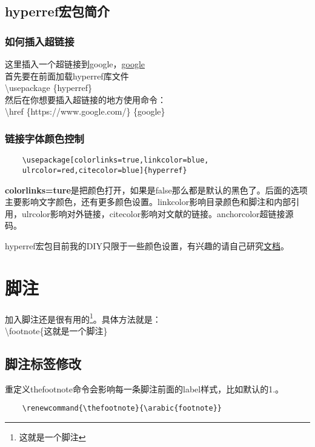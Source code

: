 \documentclass[11pt,oneside]{book}
\begin{document}
  \section{hyperref宏包简介}
  \subsection{如何插入超链接}
  这里插入一个超链接到google，\href{https://www.google.com/}{google}\\
  首先要在前面加载hyperref库文件\\
  \textbackslash usepackage \{hyperref\}\\
  然后在你想要插入超链接的地方使用命令：\\
  \textbackslash href \{https://www.google.com/\} \{google\}

  \subsection{链接字体颜色控制}
  \begin{Verbatim}
    \usepackage[colorlinks=true,linkcolor=blue,
    ulrcolor=red,citecolor=blue]{hyperref}
  \end{Verbatim}

  \textbf{colorlinks=ture}是把颜色打开，如果是false那么都是默认的黑色了。后面的选项主要影响文字颜色，还有更多颜色设置。linkcolor影响目录颜色和脚注和内部引用，ulrcolor影响对外链接，citecolor影响对文献的链接。anchorcolor超链接源码。

  hyperref宏包目前我的DIY只限于一些颜色设置，有兴趣的请自己研究\href{http://mirrors.ctan.org/macros/latex/contrib/hyperref/doc/manual.pdf}{文档}。



  \chapter{脚注}
  加入脚注还是很有用的\footnote{这就是一个脚注}。具体方法就是：\\
  \textbackslash footnote\{这就是一个脚注\}

  \section{脚注标签修改}
  重定义thefootnote命令会影响每一条脚注前面的label样式，比如默认的1.。
  \begin{Verbatim}
    \renewcommand{\thefootnote}{\arabic{footnote}}
  \end{Verbatim}
\end{document}
